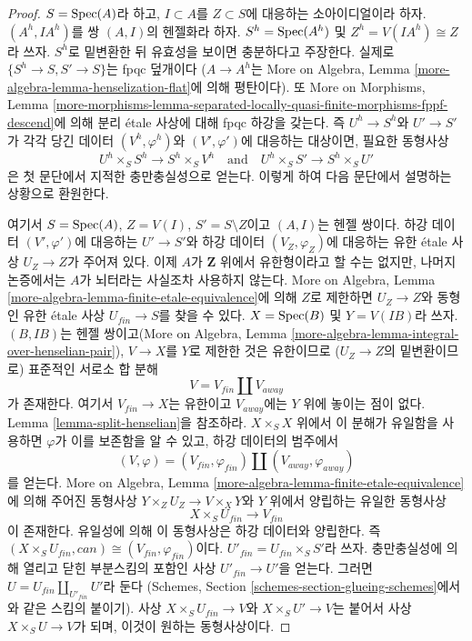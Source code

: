 \begin{proof}
\medskip\noindent
$S = \mathop{\mathrm{Spec}}(A)$라 하고, $I \subset A$를 $Z \subset S$에 대응하는
소아이디얼이라 하자. $(A^h, IA^h)$를 쌍 $(A, I)$의 헨젤화라 하자.
$S^h = \mathop{\mathrm{Spec}}(A^h)$ 및 $Z^h = V(IA^h) \cong Z$라 쓰자.
$S^h$로 밑변환한 뒤 유효성을 보이면 충분하다고 주장한다.
실제로 $\{S^h \to S, S' \to S\}$는 fpqc 덮개이다
($A \to A^h$는 More on Algebra, Lemma
\ref{more-algebra-lemma-henselization-flat}에 의해 평탄이다).
또 More on Morphisms, Lemma
\ref{more-morphisms-lemma-separated-locally-quasi-finite-morphisms-fppf-descend}에
의해 분리 \'etale 사상에 대해 fpqc 하강을 갖는다.
즉 $U^h \to S^h$와 $U' \to S'$가 각각 당긴 데이터
$(V^h, \varphi^h)$와 $(V', \varphi')$에 대응하는 대상이면,
필요한 동형사상
$$
U^h \times_S S^h \to S^h \times_S V^h
\quad\text{and}\quad
U^h \times_S S' \to S^h \times_S U'
$$
은 첫 문단에서 지적한 충만충실성으로 얻는다.
이렇게 하여 다음 문단에서 설명하는 상황으로 환원한다.

\medskip\noindent
여기서 $S = \mathop{\mathrm{Spec}}(A)$, $Z = V(I)$, $S' = S \setminus Z$이고
$(A, I)$는 헨젤 쌍이다. 하강 데이터 $(V', \varphi')$에 대응하는
$U' \to S'$와 하강 데이터 $(V_Z, \varphi_Z)$에 대응하는
유한 \'etale 사상 $U_Z \to Z$가 주어져 있다.
이제 $A$가 $\mathbf{Z}$ 위에서 유한형이라고 할 수는 없지만,
나머지 논증에서는 $A$가 뇌터라는 사실조차 사용하지 않는다.
More on Algebra, Lemma
\ref{more-algebra-lemma-finite-etale-equivalence}에 의해
$Z$로 제한하면 $U_Z \to Z$와 동형인 유한 \'etale 사상
$U_{fin} \to S$를 찾을 수 있다.
$X = \mathop{\mathrm{Spec}}(B)$ 및 $Y = V(IB)$라 쓰자.
$(B, IB)$는 헨젤 쌍이고(More on Algebra, Lemma
\ref{more-algebra-lemma-integral-over-henselian-pair}),
$V \to X$를 $Y$로 제한한 것은 유한이므로
($U_Z \to Z$의 밑변환이므로) 표준적인 서로소 합 분해
$$
V = V_{fin} \amalg V_{away}
$$
가 존재한다. 여기서 $V_{fin} \to X$는 유한이고
$V_{away}$에는 $Y$ 위에 놓이는 점이 없다.
Lemma \ref{lemma-split-henselian}을 참조하라.
$X \times_S X$ 위에서 이 분해가 유일함을 사용하면
$\varphi$가 이를 보존함을 알 수 있고, 하강 데이터의 범주에서
$$
(V, \varphi) = (V_{fin}, \varphi_{fin}) \amalg (V_{away}, \varphi_{away})
$$
를 얻는다. More on Algebra, Lemma
\ref{more-algebra-lemma-finite-etale-equivalence}에 의해
주어진 동형사상 $Y \times_Z U_Z \to V \times_X Y$와
$Y$ 위에서 양립하는 유일한 동형사상
$$
X \times_S U_{fin} \longrightarrow V_{fin}
$$
이 존재한다. 유일성에 의해 이 동형사상은 하강 데이터와 양립한다.
즉 $(X \times_S U_{fin}, can) \cong (V_{fin}, \varphi_{fin})$이다.
$U'_{fin} = U_{fin} \times_S S'$라 쓰자. 충만충실성에 의해
열리고 닫힌 부분스킴의 포함인 사상 $U'_{fin} \to U'$을 얻는다.
그러면 $U = U_{fin} \amalg_{U'_{fin}} U'$라 둔다
(Schemes, Section \ref{schemes-section-glueing-schemes}에서와 같은
스킴의 붙이기). 사상 $X \times_S U_{fin} \to V$와
$X \times_S U' \to V$는 붙어서 사상 $X \times_S U \to V$가 되며,
이것이 원하는 동형사상이다.
\end{proof}





